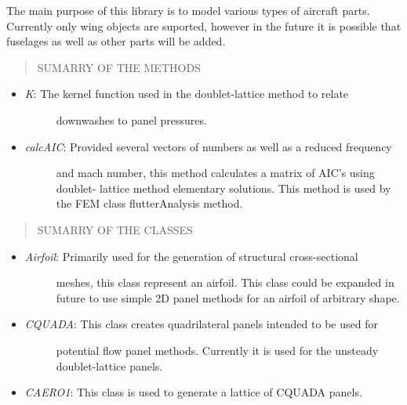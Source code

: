 \documentclass[letterpaper,10pt,english]{sphinxmanual}
\begin{document}
The main purpose of this library is to model various types of aircraft parts.
Currently only wing objects are suported, however in the future it is possible
that fuselages as well as other parts will be added.
\begin{quote}\begin{description}
\item[{SUMARRY OF THE METHODS}] \leavevmode
\end{description}\end{quote}
\begin{itemize}
\item {} \begin{description}
\item[{\emph{K}: The kernel function used in the doublet-lattice method to relate}] \leavevmode
downwashes to panel pressures.

\end{description}

\item {} \begin{description}
\item[{\emph{calcAIC}: Provided several vectors of numbers as well as a reduced frequency}] \leavevmode
and mach number, this method calculates a matrix of AIC's using doublet-
lattice method elementary solutions. This method is used by the FEM class
flutterAnalysis method.

\end{description}

\end{itemize}
\begin{quote}\begin{description}
\item[{SUMARRY OF THE CLASSES}] \leavevmode
\end{description}\end{quote}
\begin{itemize}
\item {} \begin{description}
\item[{\emph{Airfoil}: Primarily used for the generation of structural cross-sectional}] \leavevmode
meshes, this class represent an airfoil. This class could be expanded in
future to use simple 2D panel methods for an airfoil of arbitrary shape.

\end{description}

\item {} \begin{description}
\item[{\emph{CQUADA}: This class creates quadrilateral panels intended to be used for}] \leavevmode
potential flow panel methods. Currently it is used for the unsteady
doublet-lattice panels.

\end{description}

\item {} 
\emph{CAERO1}: This class is used to generate a lattice of CQUADA panels.

\end{itemize}
\end{document}
